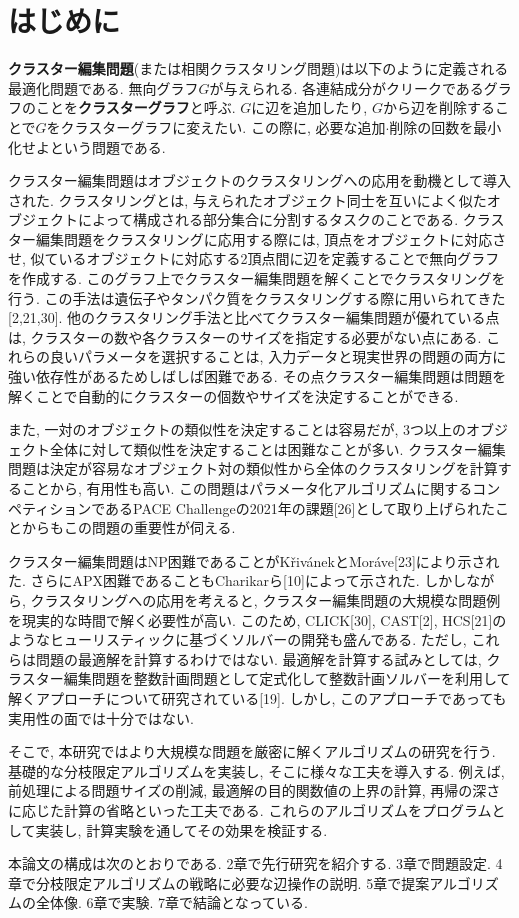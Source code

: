 \documentclass[10.5,a4paper,titlepage, dvipdfmx]{bxjsarticle}
\begin{document}
\tableofcontents
\clearpage
\section{はじめに}
\setcounter{page}{1}
\textbf{クラスター編集問題}(または相関クラスタリング問題)は以下のように定義される最適化問題である.
無向グラフ$G$が与えられる.
各連結成分がクリークであるグラフのことを\textbf{クラスターグラフ}と呼ぶ.
$G$に辺を追加したり, $G$から辺を削除することで$G$をクラスターグラフに変えたい.
この際に, 必要な追加$\cdot$削除の回数を最小化せよという問題である.\par
クラスター編集問題はオブジェクトのクラスタリングへの応用を動機として導入された.
クラスタリングとは, 与えられたオブジェクト同士を互いによく似たオブジェクトによって構成される部分集合に分割するタスクのことである.
クラスター編集問題をクラスタリングに応用する際には, 頂点をオブジェクトに対応させ, 似ているオブジェクトに対応する2頂点間に辺を定義することで無向グラフを作成する.
このグラフ上でクラスター編集問題を解くことでクラスタリングを行う.
この手法は遺伝子やタンパク質をクラスタリングする際に用いられてきた[2,21,30].
他のクラスタリング手法と比べてクラスター編集問題が優れている点は, クラスターの数や各クラスターのサイズを指定する必要がない点にある.
これらの良いパラメータを選択することは, 入力データと現実世界の問題の両方に強い依存性があるためしばしば困難である.
その点クラスター編集問題は問題を解くことで自動的にクラスターの個数やサイズを決定することができる.\par
また, 一対のオブジェクトの類似性を決定することは容易だが, 3つ以上のオブジェクト全体に対して類似性を決定することは困難なことが多い.
クラスター編集問題は決定が容易なオブジェクト対の類似性から全体のクラスタリングを計算することから, 有用性も高い.
この問題はパラメータ化アルゴリズムに関するコンペティションであるPACE Challengeの2021年の課題[26]として取り上げられたことからもこの問題の重要性が伺える.\par
クラスター編集問題はNP困難であることがKřivánekとMoráve[23]により示された.
さらにAPX困難であることもCharikarら[10]によって示された.
しかしながら, クラスタリングへの応用を考えると, クラスター編集問題の大規模な問題例を現実的な時間で解く必要性が高い.
このため, CLICK[30], CAST[2], HCS[21]のようなヒューリスティックに基づくソルバーの開発も盛んである.
ただし, これらは問題の最適解を計算するわけではない.
最適解を計算する試みとしては, クラスター編集問題を整数計画問題として定式化して整数計画ソルバーを利用して解くアプローチについて研究されている[19].
しかし, このアプローチであっても実用性の面では十分ではない.\par
そこで, 本研究ではより大規模な問題を厳密に解くアルゴリズムの研究を行う.
基礎的な分枝限定アルゴリズムを実装し, そこに様々な工夫を導入する.
例えば, 前処理による問題サイズの削減, 最適解の目的関数値の上界の計算, 再帰の深さに応じた計算の省略といった工夫である.
これらのアルゴリズムをプログラムとして実装し, 計算実験を通してその効果を検証する.\par
本論文の構成は次のとおりである.
2章で先行研究を紹介する.
3章で問題設定.
4章で分枝限定アルゴリズムの戦略に必要な辺操作の説明.
5章で提案アルゴリズムの全体像.
6章で実験.
7章で結論となっている.
\end{document}
